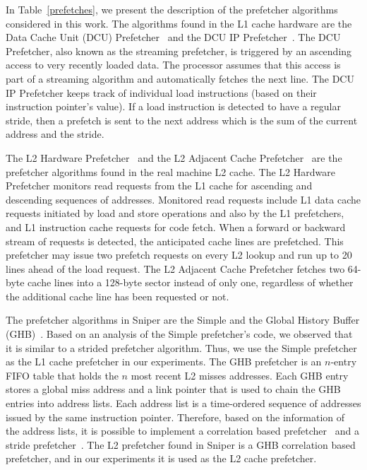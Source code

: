 \documentclass[AMA,final,STIX1COL]{WileyNJD-v2}
\newcommand{\ms}[1]{\textcolor{orange}{\bfseries \ul{ msserpa: #1} }\vspace{0.2cm}}
\newcommand{\vsg}[1]{\textcolor{blue}{\bfseries \ul{vsgirelli: #1} }\vspace{0.2cm}}
\begin{document}

In Table~\ref{prefetches}, we present the description of the prefetcher algorithms considered in this work. 
The algorithms found in the L1 cache hardware are the Data Cache Unit (DCU) Prefetcher~\cite{intelmanual} and the DCU IP Prefetcher~\cite{intelmanual}.
The DCU Prefetcher, also known as the streaming prefetcher, is triggered by an ascending access to very recently loaded data. 
The processor assumes that this access is part of a streaming algorithm and automatically fetches the next line.
The DCU IP Prefetcher keeps track of individual load instructions (based on their instruction pointer's value). 
If a load instruction is detected to have a regular stride, then a prefetch is sent to the next address which is the sum of the current address and the stride.


The L2 Hardware Prefetcher~\cite{intelmanual} and the L2 Adjacent Cache Prefetcher~\cite{intelmanual} are the prefetcher algorithms found in the real machine L2 cache.
The L2 Hardware Prefetcher monitors read requests from the L1 cache for ascending and descending sequences of addresses. 
Monitored read requests include L1 data cache requests initiated by load and store operations and also by the L1 prefetchers, and L1 instruction cache requests for code fetch.
When a forward or backward stream of requests is detected, the anticipated cache lines are prefetched.
This prefetcher may issue two prefetch requests on every L2 lookup and run up to 20 lines ahead of the load request. 
The L2 Adjacent Cache Prefetcher fetches two 64-byte cache lines into a 128-byte sector instead of only one, regardless of whether the additional cache line has been requested or not.

The prefetcher algorithms in Sniper are the Simple and the Global History Buffer (GHB)~\cite{nesbit2004data}.
Based on an analysis of the Simple prefetcher's code, we observed that it is similar to a strided prefetcher algorithm.
Thus, we use the Simple prefetcher as the L1 cache prefetcher in our experiments.
The GHB prefetcher is an $n$-entry FIFO table that holds the $n$ most recent L2 misses addresses. 
Each GHB entry stores a global miss address and a link pointer that is used to chain the GHB entries into address lists. 
Each address list is a time-ordered sequence of addresses issued by the same instruction pointer.
Therefore, based on the information of the address lists, it is possible to implement a correlation based prefetcher~\cite{charney1995GeneralizedCB} and a stride prefetcher~\cite{nesbit2004data}.
The L2 prefetcher found in Sniper is a GHB correlation based prefetcher, and in our experiments it is used as the L2 cache prefetcher.
\end{document}
